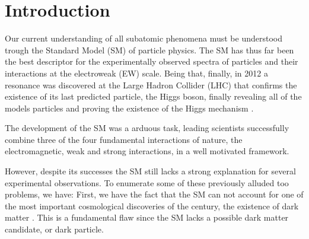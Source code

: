 
\newpage

\chapter{Introduction}
\label{Chap:Introduction}


Our current understanding of all subatomic phenomena must be understood trough the Standard Model (SM) of particle physics. 
%
%
The SM has thus far been the best descriptor for the experimentally observed spectra of particles and their interactions at the electroweak (EW) scale. 
%
Being that, finally, in 2012 a resonance was discovered at the Large Hadron Collider (LHC) that confirms the existence of its last predicted particle, the Higgs boson, finally revealing all of the models particles and proving the existence of the Higgs mechanism \cite{collaborations2016measurements}. 

The development of the SM was a arduous task, leading scientists successfully combine three of the four fundamental interactions of nature, the electromagnetic, weak and strong interactions, in a well motivated framework. 

However, despite its successes the SM still lacks a strong explanation for several experimental observations. 
%
%
To enumerate some of these previously alluded too problems, we have:
%
First, we have the fact that the SM can not account for one of the most important cosmological discoveries of the century, the existence of dark matter \cite{Bergstr_m_2000}. 
%
This is a fundamental flaw since the SM lacks a possible dark matter candidate, or dark particle. %
%

